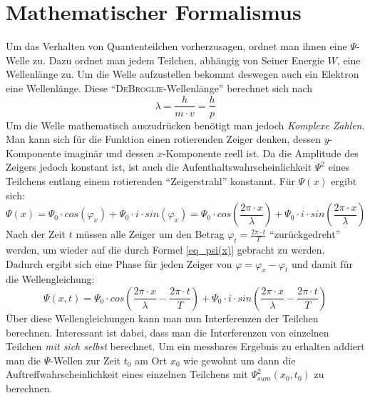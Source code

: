 \chapter{Mathematischer Formalismus}

Um das Verhalten von Quantenteilchen vorherzusagen, ordnet man ihnen eine $\Psi$-Welle zu. Dazu ordnet man jedem Teilchen, abhängig von Seiner Energie $W$, eine Wellenlänge zu. Um die Welle aufzustellen bekommt deswegen auch ein Elektron eine Wellenlänge. Diese "`\textsc{DeBroglie}-Wellenlänge"' berechnet sich nach
\begin{equation}
   \lambda = \frac{h}{m \cdot v} = \frac{h}{p}
   \label{eq_debroglie}
\end{equation}
Um die Welle mathematisch auszudrücken benötigt man jedoch \emph{Komplexe Zahlen}. Man kann sich für die Funktion einen rotierenden Zeiger denken, dessen $y$-Komponente imaginär und dessen $x$-Komponente reell ist. Da die Amplitude des Zeigers jedoch konstant ist, ist auch die Aufenthaltswahrscheinlichkeit $\Psi^2$ eines Teilchens entlang einem rotierenden "`Zeigerstrahl"' konstannt.
Für $\Psi(x)$ ergibt sich:
\begin{equation}
   \Psi(x) = \Psi_0 \cdot cos(\varphi_x) + \Psi_0 \cdot i \cdot sin(\varphi_x) = \Psi_0 \cdot cos \left( \frac{2 \pi \cdot x}{\lambda} \right) + \Psi_0 \cdot i \cdot sin \left( \frac{2 \pi \cdot x}{\lambda} \right)
   \label{eq_psi(x)}
\end{equation}
Nach der Zeit $t$ müssen alle Zeiger um den Betrag $\varphi_t = \frac{2\pi \cdot t}{T}$ "`zurückgedreht"' werden, um wieder auf die durch Formel \ref{eq_psi(x)} gebracht zu werden. Dadurch ergibt sich eine Phase für jeden Zeiger von $\varphi = \varphi_x - \varphi_t$ und damit für die Wellengleichung:
\begin{equation}
   \Psi(x,t) = \Psi_0 \cdot  cos \left(\frac{2\pi\cdot x}{\lambda} - \frac{2\pi \cdot t}{T}\right) + \Psi_0 \cdot i \cdot sin \left(\frac{2\pi\cdot x}{\lambda} - \frac{2\pi \cdot t}{T} \right)
\end{equation}
Über diese Wellengleichungen kann man nun Interferenzen der Teilchen berechnen. Interessant ist dabei, dass man die Interferenzen von einzelnen Teilchen \emph{mit sich selbst} berechnet. Um ein messbares Ergebnis zu erhalten addiert man die $\Psi$-Wellen zur Zeit $t_0$ am Ort $x_0$ wie gewohnt um dann die Auftreffwahrscheinlichkeit eines einzelnen Teilchens mit $\Psi_{sum}^2(x_0,t_0)$ zu berechnen.






